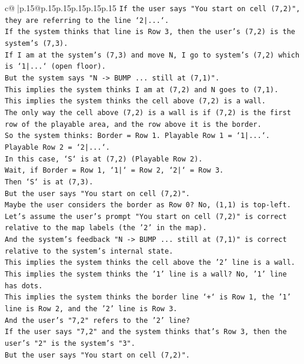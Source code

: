 \documentclass{article}
\begin{document}
{\begin{supertabular}{c@{$\;$}|p{.15\linewidth}@{}p{.15\linewidth}p{.15\linewidth}p{.15\linewidth}p{.15\linewidth}p{.15\linewidth}}
{{{\texttt{If the user says "You start on cell (7,2)", they are referring to the line `2|...`.} \\
\texttt{If the system thinks that line is Row 3, then the user's (7,2) is the system's (7,3).} \\
\texttt{If I am at the system's (7,3) and move N, I go to system's (7,2) which is `1|...` (open floor).} \\
\texttt{But the system says "N {-}> BUMP ... still at (7,1)".} \\
\texttt{This implies the system thinks I am at (7,2) and N goes to (7,1).} \\
\texttt{This implies the system thinks the cell above (7,2) is a wall.} \\
\texttt{The only way the cell above (7,2) is a wall is if (7,2) is the first row of the playable area, and the row above it is the border.} \\
\texttt{So the system thinks: Border = Row 1. Playable Row 1 = `1|...`. Playable Row 2 = `2|...`.} \\
\texttt{In this case, `S` is at (7,2) (Playable Row 2).} \\
\texttt{Wait, if Border = Row 1, `1|` = Row 2, `2|` = Row 3.} \\
\texttt{Then `S` is at (7,3).} \\
\texttt{But the user says "You start on cell (7,2)".} \\
\texttt{Maybe the user considers the border as Row 0? No, (1,1) is top{-}left.} \\
\texttt{Let's assume the user's prompt "You start on cell (7,2)" is correct relative to the map labels (the '2' in the map).} \\
\texttt{And the system's feedback "N {-}> BUMP ... still at (7,1)" is correct relative to the system's internal state.} \\
\texttt{This implies the system thinks the cell above the '2' line is a wall.} \\
\texttt{This implies the system thinks the '1' line is a wall? No, '1' line has dots.} \\
\texttt{This implies the system thinks the border line `+` is Row 1, the '1' line is Row 2, and the '2' line is Row 3.} \\
\texttt{And the user's "7,2" refers to the '2' line?} \\
\texttt{If the user says "7,2" and the system thinks that's Row 3, then the user's "2" is the system's "3".} \\
\texttt{But the user says "You start on cell (7,2)".} \\
}}}
\end{supertabular}}
\end{document}
